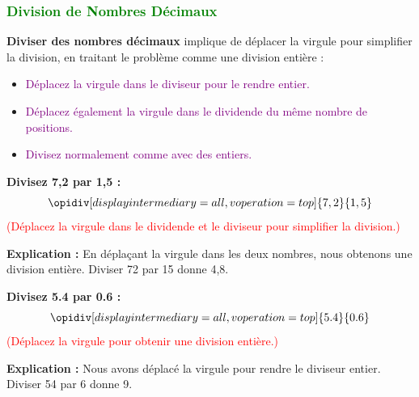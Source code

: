 \documentclass{article}
\begin{document}
\subsubsection{\textcolor{green}{Division de Nombres Décimaux}}

\vspace{0.25cm}

\textbf{Diviser des nombres décimaux} implique de déplacer la virgule pour simplifier la division, en traitant le problème comme une division entière :

    \begin{itemize}
        \item \textcolor{purple}{Déplacez la virgule dans le diviseur pour le rendre entier.}
        \item \textcolor{purple}{Déplacez également la virgule dans le dividende du même nombre de positions.}
        \item \textcolor{purple}{Divisez normalement comme avec des entiers.}
    \end{itemize}

\vspace{0.2cm}

\begin{tcolorbox}[colback=orange!10!white, colframe=orange!75!black, sharp corners=south, boxrule=0.8mm, title=Exemple de Division]
    \textbf{Divisez 7,2 par 1,5 :}
    \[
    \opidiv[displayintermediary=all,voperation=top]{7,2}{1,5}
    \]
    \textcolor{red}{(Déplacez la virgule dans le dividende et le diviseur pour simplifier la division.)}
    
    \textbf{Explication :} En déplaçant la virgule dans les deux nombres, nous obtenons une division entière. Diviser 72 par 15 donne 4,8.
\end{tcolorbox}

\begin{tcolorbox}[colback=orange!10!white, colframe=orange!75!black, sharp corners=south, boxrule=0.8mm, title=Exemple de Division]
    \textbf{Divisez 5.4 par 0.6 :}
    \[
    \opidiv[displayintermediary=all,voperation=top]{5.4}{0.6}
    \]
    \textcolor{red}{(Déplacez la virgule pour obtenir une division entière.)}
    
    \textbf{Explication :} Nous avons déplacé la virgule pour rendre le diviseur entier. Diviser 54 par 6 donne 9.
\end{tcolorbox}

\vspace{0.35cm}
\end{document}
